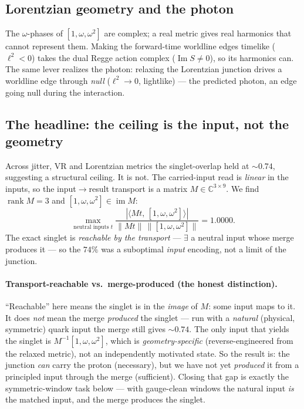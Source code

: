 \documentclass[11pt]{article}
\newcommand{\C}{\mathbb{C}}
\newcommand{\lsq}{\ell^2}
\begin{document}
\subsection{Lorentzian geometry and the photon}

The $\omega$-phases of $[1,\omega,\omega^2]$ are complex; a real metric gives real
harmonics that cannot represent them. Making the forward-time worldline edges
timelike ($\lsq<0$) takes the dual Regge action complex
($\operatorname{Im}S\neq 0$), so its harmonics can. The same lever realizes the
photon: relaxing the Lorentzian junction drives a worldline edge through
\emph{null} ($\lsq\to 0$, lightlike) --- the predicted photon, an edge going null
during the interaction.

\subsection{The headline: the ceiling is the input, not the geometry}

Across jitter, VR and Lorentzian metrics the singlet-overlap held at $\sim 0.74$,
suggesting a structural ceiling. It is not. The carried-input read is \emph{linear}
in the inputs, so the input$\to$result transport is a matrix $M\in\C^{3\times 9}$.
We find $\operatorname{rank}M=3$ and $[1,\omega,\omega^2]\in\operatorname{im}M$:
\[
  \max_{\text{neutral inputs }t}\frac{|\langle M t,\,[1,\omega,\omega^2]\rangle|}
       {\lVert Mt\rVert\,\lVert[1,\omega,\omega^2]\rVert}=1.0000 .
\]
The exact singlet is \emph{reachable by the transport} --- $\exists$ a neutral
input whose merge produces it --- so the $74\%$ was a suboptimal \emph{input}
encoding, not a limit of the junction.

\paragraph{Transport-reachable vs.\ merge-produced (the honest distinction).}
``Reachable'' here means the singlet is in the \emph{image} of $M$: some input maps
to it. It does \emph{not} mean the merge \emph{produced} the singlet --- run with a
\emph{natural} (physical, symmetric) quark input the merge still gives $\sim 0.74$.
The only input that yields the singlet is $M^{-1}[1,\omega,\omega^2]$, which is
\emph{geometry-specific} (reverse-engineered from the relaxed metric), not an
independently motivated state. So the result is: the junction \emph{can} carry the
proton (necessary), but we have not yet \emph{produced} it from a principled input
through the merge (sufficient). Closing that gap is exactly the symmetric-window
task below --- with gauge-clean windows the natural input \emph{is} the matched
input, and the merge produces the singlet.
\end{document}
